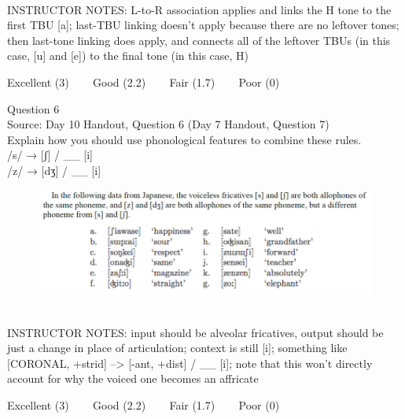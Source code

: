 \documentclass[12pt]{article}
\begin{document}
~\\
INSTRUCTOR NOTES: L-to-R association applies and links the H tone to the first TBU [a]; last-TBU linking doesn't apply because there are no leftover tones; then last-tone linking does apply, and connects all of the leftover TBUs (in this case, [u] and [e]) to the final tone (in this case, H)


\vfill
Excellent (3) ~~~ Good (2.2) ~~~ Fair (1.7) ~~~ Poor (0)
\newpage

{\large Question 6}\\

Source: Day 10 Handout, Question 6 (Day 7 Handout, Question 7)\\

Explain how you should use phonological features to combine these rules.\\

/s/ → {[ʃ]} / \_\_ {[i]} \\/z/ → {[dʒ]} / \_\_ {[i]}

\begin{figure}[H]
\includegraphics{../images/japanese.png}
\end{figure}

~\\
INSTRUCTOR NOTES: input should be alveolar fricatives, output should be just a change in place of articulation; context is still [i]; something like [CORONAL, +strid] --> [-ant, +dist] / \_\_ [i]; note that this won't directly account for why the voiced one becomes an affricate


\vfill
Excellent (3) ~~~ Good (2.2) ~~~ Fair (1.7) ~~~ Poor (0)
\newpage

\begin{center}
\textbf{{\color{red}{\HUGE END OF EXAM}}}\\

\end{center}
\newpage

\begin{center}
\textbf{{\color{blue}{\HUGE START OF EXAM\\}}}

\textbf{{\color{blue}{\HUGE Student ID: 1956\\}}}

\textbf{{\color{blue}{\HUGE 3:20 - 3:40 PM\\}}}

\end{center}
\newpage
\end{document}

